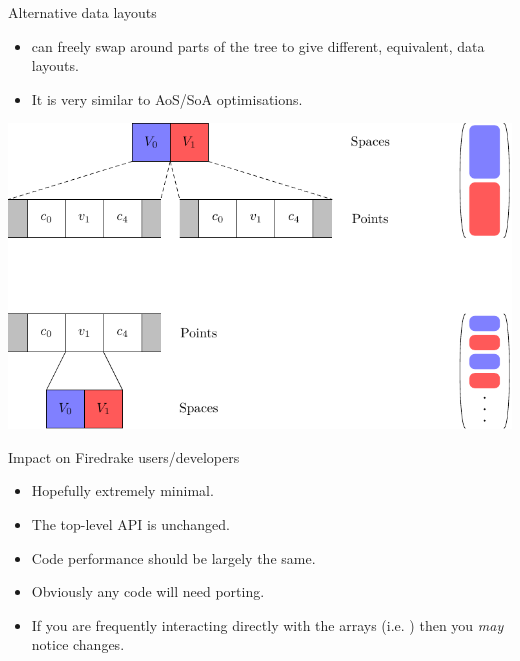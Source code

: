 \documentclass[aspectratio=169]{beamer}
\begin{document}
\begin{frame}{Alternative data layouts}
  \begin{itemize}
    \item
       can freely swap around parts of the tree to give different, equivalent, data layouts.
    \item
      It is very similar to AoS/SoA optimisations.
  \end{itemize}

  \begin{center}
    \includegraphics[width=.6\textwidth]{transform.pdf}
  \end{center}
\end{frame}

\begin{frame}{Impact on Firedrake users/developers}
  \begin{itemize}
    \item
      Hopefully extremely minimal.
    \item The top-level API is unchanged.
    \item
      Code performance should be largely the same.
    \item
      Obviously any  code will need porting.
    \item
      If you are frequently interacting directly with the arrays (i.e. ) then you \emph{may} notice changes.
  \end{itemize}
\end{frame}
\end{document}
